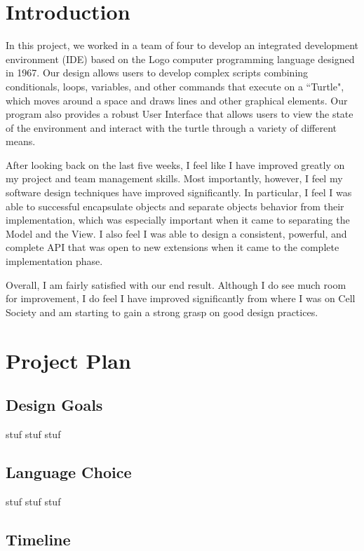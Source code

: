\documentclass[11pt]{article}
\newcommand{\quotes}[1]{``#1"}
\begin{document}
\section{Introduction}
In this project, we worked in a team of four to develop an integrated development environment (IDE) based on the Logo computer programming language designed in 1967. Our design allows users to develop complex scripts combining conditionals, loops, variables, and other commands that execute on a \quotes{Turtle}, which moves around a space and draws lines and other graphical elements. Our program also provides a robust User Interface that allows users to view the state of the environment and interact with the turtle through a variety of different means. 
\par
After looking back on the last five weeks, I feel like I have improved greatly on my project and team management skills. Most importantly, however, I feel my software design techniques have improved significantly. In particular, I feel I was able to successful encapsulate objects and separate objects behavior from their implementation, which was especially important when it came to separating the Model and the View. I also feel I was able to design a consistent, powerful, and complete API that was open to new extensions when it came to the complete implementation phase. 

Overall, I am fairly satisfied with our end result. Although I do see much room for improvement, I do feel I have improved significantly from where I was on Cell Society and am starting to gain a strong grasp on good design practices. 

\section{Project Plan}

\subsection{Design Goals}

stuf stuf stuf

\subsection{Language Choice}

stuf stuf stuf

\subsection{Timeline}
\end{document}
